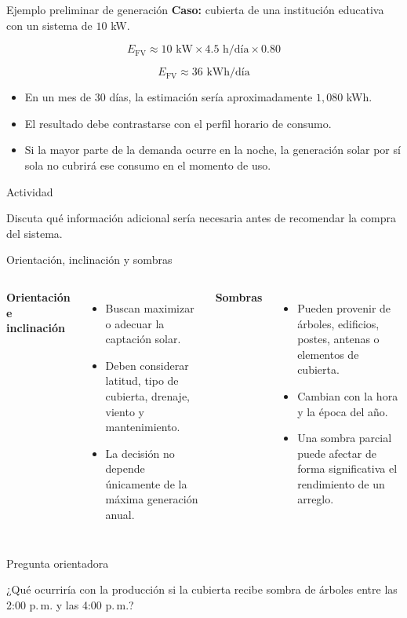 \documentclass[aspectratio=169,10pt]{beamer}
\newcommand{\actividad}[1]{
\begin{alertblock}{Actividad}
#1
\end{alertblock}
}
\newcommand{\pregunta}[1]{
\begin{exampleblock}{Pregunta orientadora}
#1
\end{exampleblock}
}
\begin{document}
\begin{frame}{Ejemplo preliminar de generación}
\textbf{Caso:} cubierta de una institución educativa con un sistema de \(10\) kW.

\[
E_{\text{FV}} \approx 10 \text{ kW} \times 4.5 \text{ h/día} \times 0.80
\]

\[
E_{\text{FV}} \approx 36 \text{ kWh/día}
\]

\begin{itemize}
    \item En un mes de 30 días, la estimación sería aproximadamente \(1{,}080\) kWh.
    \item El resultado debe contrastarse con el perfil horario de consumo.
    \item Si la mayor parte de la demanda ocurre en la noche, la generación solar por sí sola no cubrirá ese consumo en el momento de uso.
\end{itemize}

\actividad{
Discuta qué información adicional sería necesaria antes de recomendar la compra del sistema.
}
\end{frame}

\begin{frame}{Orientación, inclinación y sombras}
\begin{columns}
\textbf{Orientación e inclinación}
\begin{itemize}
    \item Buscan maximizar o adecuar la captación solar.
    \item Deben considerar latitud, tipo de cubierta, drenaje, viento y mantenimiento.
    \item La decisión no depende únicamente de la máxima generación anual.
\end{itemize}

\textbf{Sombras}
\begin{itemize}
    \item Pueden provenir de árboles, edificios, postes, antenas o elementos de cubierta.
    \item Cambian con la hora y la época del año.
    \item Una sombra parcial puede afectar de forma significativa el rendimiento de un arreglo.
\end{itemize}
\end{columns}

\vspace{0.4cm}

\pregunta{
¿Qué ocurriría con la producción si la cubierta recibe sombra de árboles entre las 2:00 p.\,m. y las 4:00 p.\,m.?
}
\end{frame}
\end{document}

